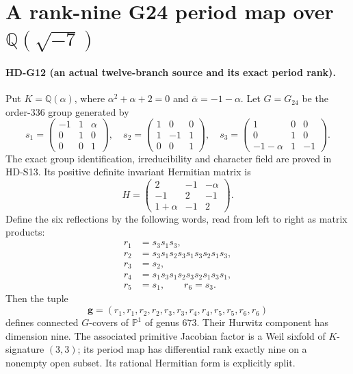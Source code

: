 \section{A rank-nine G24 period map over \texorpdfstring{$\mathbb Q(\sqrt{-7})$}{Q(sqrt(-7))}}

\paragraph{HD-G12 (an actual twelve-branch source and its exact period rank).}
Put $K=\mathbb Q(\alpha)$, where
$\alpha^2+\alpha+2=0$ and $\bar\alpha=-1-\alpha$.
Let $G=G_{24}$ be the order-$336$ group generated by
\[
s_1=\begin{pmatrix}-1&1&\alpha\\0&1&0\\0&0&1\end{pmatrix},
\quad
s_2=\begin{pmatrix}1&0&0\\1&-1&1\\0&0&1\end{pmatrix},
\quad
s_3=\begin{pmatrix}1&0&0\\0&1&0\\-1-\alpha&1&-1\end{pmatrix}.
\tag{G12.1}
\]
The exact group identification, irreducibility and character field are
proved in HD-S13. Its positive definite invariant Hermitian matrix is
\[
H=\begin{pmatrix}2&-1&-\alpha\\-1&2&-1\\1+\alpha&-1&2\end{pmatrix}.
\]
Define the six reflections by the following words, read from left to
right as matrix products:
\[
\begin{split}
r_1&=s_3s_1s_3,\\
r_2&=s_3s_1s_2s_3s_1s_3s_2s_1s_3,\\
r_3&=s_2,\\
r_4&=s_1s_3s_1s_2s_3s_2s_1s_3s_1,\\
r_5&=s_1,\qquad r_6=s_3.
\end{split}
\tag{G12.2}
\]
Then the tuple
\[
\boldsymbol g=(r_1,r_1,r_2,r_2,r_3,r_3,r_4,r_4,r_5,r_5,r_6,r_6)
\tag{G12.3}
\]
defines connected $G$-covers of $\mathbb P^1$ of genus $673$.
Their Hurwitz component has dimension nine. The associated primitive
Jacobian factor is a Weil sixfold of $K$-signature $(3,3)$; its
period map has differential rank exactly nine on a nonempty open
subset. Its rational Hermitian form is explicitly split.

